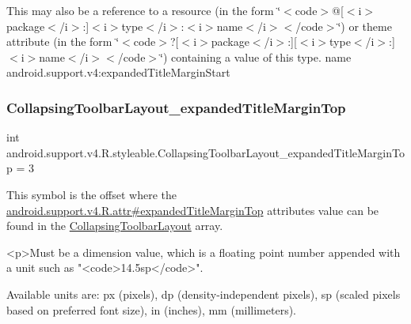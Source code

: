 This may also be a reference to a resource (in the form \char`\"{}$<$code$>$@\mbox{[}$<$i$>$package$<$/i$>$\+:\mbox{]}$<$i$>$type$<$/i$>$\+:$<$i$>$name$<$/i$>$$<$/code$>$\char`\"{}) or theme attribute (in the form \char`\"{}$<$code$>$?\mbox{[}$<$i$>$package$<$/i$>$\+:\mbox{]}\mbox{[}$<$i$>$type$<$/i$>$\+:\mbox{]}$<$i$>$name$<$/i$>$$<$/code$>$\char`\"{}) containing a value of this type.  name android.\+support.\+v4\+:expanded\+Title\+Margin\+Start \mbox{\label{classandroid_1_1support_1_1v4_1_1R_1_1styleable_a9e49bb8ccfb4c8294690cba1fce71f73}} 
\subsubsection{\texorpdfstring{Collapsing\+Toolbar\+Layout\+\_\+expanded\+Title\+Margin\+Top}{CollapsingToolbarLayout\_expandedTitleMarginTop}}
{\footnotesize\ttfamily int android.\+support.\+v4.\+R.\+styleable.\+Collapsing\+Toolbar\+Layout\+\_\+expanded\+Title\+Margin\+Top = 3\hspace{0.3cm}{\ttfamily [static]}}

This symbol is the offset where the \hyperlink{classandroid_1_1support_1_1v4_1_1R_1_1attr_a8ff24ef763c69050c7178b685ee96561}{android.\+support.\+v4.\+R.\+attr\#expanded\+Title\+Margin\+Top} attribute\textquotesingle{}s value can be found in the \hyperlink{classandroid_1_1support_1_1v4_1_1R_1_1styleable_a91b20e27088c910353d38c1efde32aa9}{Collapsing\+Toolbar\+Layout} array.

\begin{DoxyVerb}      <p>Must be a dimension value, which is a floating point number appended with a unit such as "<code>14.5sp</code>".
\end{DoxyVerb}
 Available units are\+: px (pixels), dp (density-\/independent pixels), sp (scaled pixels based on preferred font size), in (inches), mm (millimeters). 

